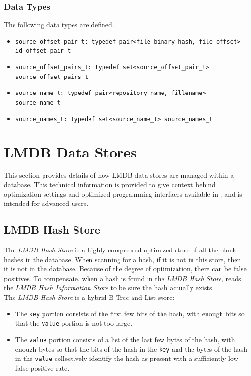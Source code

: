 \documentclass[11pt,fleqn]{article} %
\begin{document}
\subsubsection{Data Types}

The following data types are defined.

\begin{itemize}
\item \verb+source_offset_pair_t: typedef pair<file_binary_hash, file_offset> id_offset_pair_t+
\item \verb+source_offset_pairs_t: typedef set<source_offset_pair_t> source_offset_pairs_t+
\item \verb+source_name_t: typedef pair<repository_name, fillename> source_name_t+
\item \verb+source_names_t: typedef set<source_name_t> source_names_t+
\end{itemize}

\section{LMDB Data Stores}
This section provides details of how LMDB data stores are managed within a \hdb database. This technical information is provided to give context behind optimization settings and optimized programming interfaces available in \hdb, and is intended for advanced users.\\

\subsection{LMDB Hash Store}
The \textit{LMDB Hash Store} is a highly compressed optimized store of all the block hashes in the database.  When scanning for a hash, if it is not in this store, then it is not in the database.  Because of the degree of optimization, there can be false positives.  To compensate, when a hash is found in the \textit{LMDB Hash Store}, \hdb reads the \textit{LMDB Hash Information Store} to be sure the hash actually exists.\\

The \textit{LMDB Hash Store} is a hybrid B-Tree and List store:
\begin{itemize}
\item The \verb+key+ portion consists of the first few bits of the hash, with enough bits so that the \verb+value+ portion is not too large.
\item The \verb+value+ portion consists of a list of the last few bytes of the hash, with enough bytes so that the bits of the hash in the \verb+key+ and the bytes of the hash in the \verb+value+ collectively identify the hash as present with a sufficiently low false positive rate.
\end{itemize}
\end{document}
